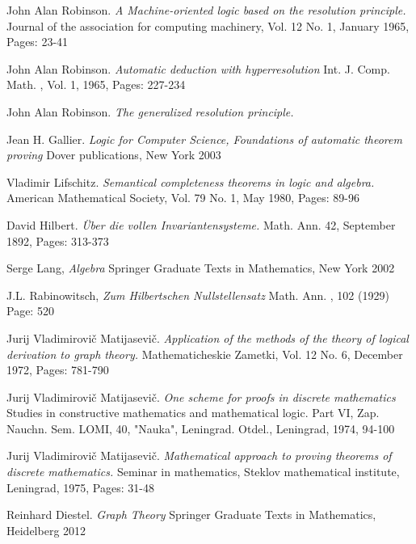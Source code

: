 {\newpage
{}
{}
\begin{thebibliography}{9}
 
John Alan Robinson.  
\textit{A Machine-oriented logic based on the resolution principle.} 
Journal of the association for computing machinery, Vol. 12 No. 1, January 1965, Pages: 23-41

John Alan Robinson.  
\textit{Automatic deduction with hyperresolution} 
Int. J. Comp. Math. , Vol. 1, 1965, Pages: 227-234
 
John Alan Robinson.  
\textit{The generalized resolution principle.} 

 Jean H. Gallier. \textit{Logic for Computer Science, Foundations of automatic theorem proving } Dover publications, New York 2003

Vladimir Lifschitz.
\textit{Semantical completeness theorems in logic and algebra.} 
American Mathematical Society, Vol. 79 No. 1, May 1980, Pages: 89-96 

David Hilbert. \textit{\"Uber die vollen Invariantensysteme.} Math. Ann. 42, September 1892, Pages: 313-373

Serge Lang, \textit{Algebra} Springer Graduate Texts in Mathematics, New York 2002


J.L. Rabinowitsch, \textit{Zum Hilbertschen Nullstellensatz} Math. Ann. , 102 (1929) Page: 520
 
Jurij Vladimirovi\v{c} Matijasevi\v{c}.
\textit{Application of the methods of the theory of logical derivation to graph theory.} Mathematicheskie Zametki, Vol. 12 No. 6, December 1972, Pages: 781-790

Jurij Vladimirovi\v{c} Matijasevi\v{c}.
\textit{One scheme for proofs in discrete mathematics} Studies in constructive mathematics and mathematical logic. Part VI, Zap. Nauchn. Sem. LOMI, 40, "Nauka", Leningrad. Otdel., Leningrad, 1974, 94-100 

Jurij Vladimirovi\v{c} Matijasevi\v{c}.
\textit{Mathematical approach to proving theorems of discrete mathematics.} 
Seminar in mathematics, Steklov mathematical institute, Leningrad, 1975, Pages: 31-48

 Reinhard Diestel. \textit{Graph Theory} Springer Graduate Texts in Mathematics, Heidelberg 2012




\end{thebibliography}}
